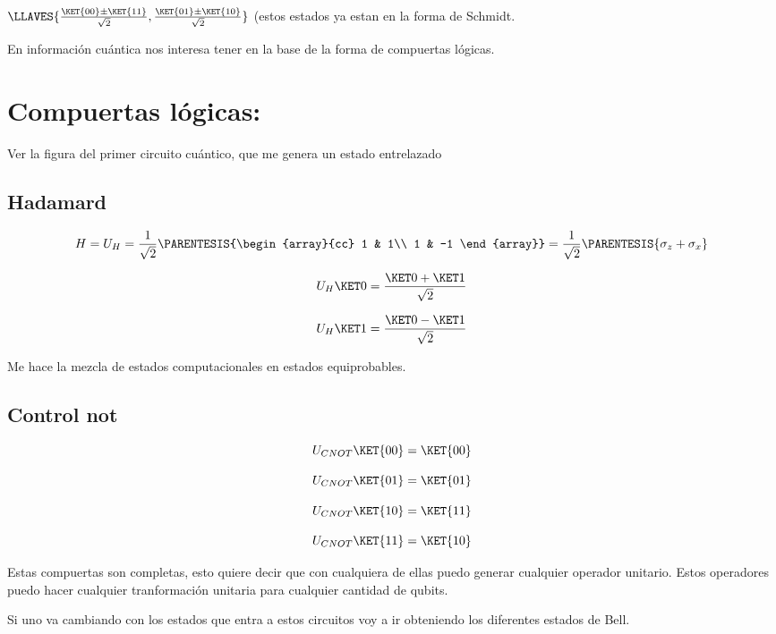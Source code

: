 $\LLAVES{\frac{\KET{00}\pm\KET{11}}{\sqrt{2}},\frac{\KET{01}\pm\KET{10}}{\sqrt{2}}}$
(estos estados ya estan en la forma de Schmidt. 

En información cuántica nos interesa tener en la base de la forma
de compuertas lógicas.

\section{Compuertas lógicas:}

Ver la figura del primer circuito cuántico, que me genera un estado
entrelazado

\subsection{Hadamard}

\[
H=U_{H}=\frac{1}{\sqrt{2}}\PARENTESIS{\begin{array}{cc}
1 & 1\\
1 & -1
\end{array}}=\frac{1}{\sqrt{2}}\PARENTESIS{\sigma_{z}+\sigma_{x}}
\]

\[
U_{H}\KET 0=\frac{\KET 0+\KET 1}{\sqrt{2}}
\]

\[
U_{H}\KET 1=\frac{\KET 0-\KET 1}{\sqrt{2}}
\]

Me hace la mezcla de estados computacionales en estados equiprobables.

\subsection*{Control not}

\[
U_{CNOT}\KET{00}=\KET{00}
\]

\[
U_{CNOT}\KET{01}=\KET{01}
\]

\[
U_{CNOT}\KET{10}=\KET{11}
\]

\[
U_{CNOT}\KET{11}=\KET{10}
\]

Estas compuertas son completas, esto quiere decir que con cualquiera
de ellas puedo generar cualquier operador unitario. Estos operadores
puedo hacer cualquier tranformación unitaria para cualquier cantidad
de qubits. 

Si uno va cambiando con los estados que entra a estos circuitos voy
a ir obteniendo los diferentes estados de Bell.

